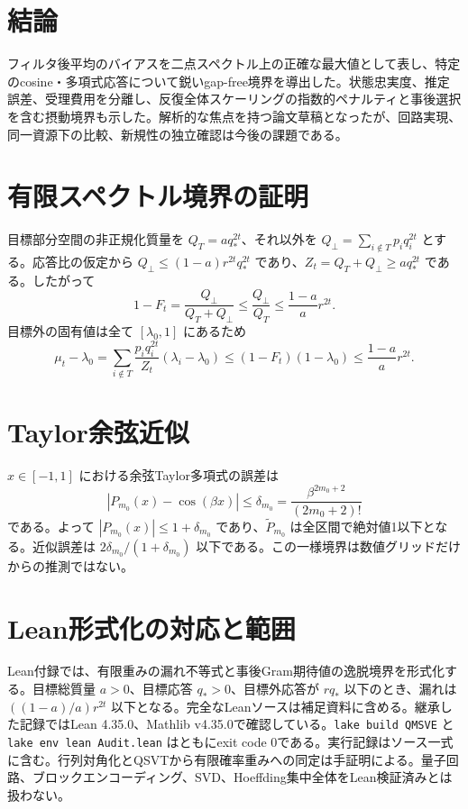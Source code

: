 \documentclass[11pt,a4paper]{article}
\begin{document}
{\section{結論}
フィルタ後平均のバイアスを二点スペクトル上の正確な最大値として表し、特定のcosine・多項式応答について鋭いgap-free境界を導出した。状態忠実度、推定誤差、受理費用を分離し、反復全体スケーリングの指数的ペナルティと事後選択を含む摂動境界も示した。解析的な焦点を持つ論文草稿となったが、回路実現、同一資源下の比較、新規性の独立確認は今後の課題である。

\appendix
\section{有限スペクトル境界の証明}
目標部分空間の非正規化質量を $Q_T=aq_*^{2t}$、それ以外を $Q_\perp=\sum_{i\notin T}p_iq_i^{2t}$ とする。応答比の仮定から $Q_\perp\leq(1-a)r^{2t}q_*^{2t}$ であり、$Z_t=Q_T+Q_\perp\geq aq_*^{2t}$ である。したがって
\[
 1-F_t=\frac{Q_\perp}{Q_T+Q_\perp}
 \leq\frac{Q_\perp}{Q_T}
 \leq\frac{1-a}{a}r^{2t}.
\]
目標外の固有値は全て $[\lambda_0,1]$ にあるため
\[
 \mu_t-\lambda_0
 =\sum_{i\notin T}\frac{p_iq_i^{2t}}{Z_t}(\lambda_i-\lambda_0)
 \leq(1-F_t)(1-\lambda_0)
 \leq\frac{1-a}{a}r^{2t}.
\]

\section{Taylor余弦近似}
$x\in[-1,1]$ における余弦Taylor多項式の誤差は
\[
 |P_{m_0}(x)-\cos(\beta x)|\leq
 \delta_{m_0}=\frac{\beta^{2m_0+2}}{(2m_0+2)!}
\]
である。よって $|P_{m_0}(x)|\leq1+\delta_{m_0}$ であり、$\widetilde P_{m_0}$ は全区間で絶対値1以下となる。近似誤差は $2\delta_{m_0}/(1+\delta_{m_0})$ 以下である。この一様境界は数値グリッドだけからの推測ではない。

\section{Lean形式化の対応と範囲}
Lean付録では、有限重みの漏れ不等式と事後Gram期待値の逸脱境界を形式化する。目標総質量 $a>0$、目標応答 $q_*>0$、目標外応答が $r q_*$ 以下のとき、漏れは $((1-a)/a)r^{2t}$ 以下となる。完全なLeanソースは補足資料に含める。継承した記録ではLean 4.35.0、Mathlib v4.35.0で確認している。\texttt{lake build QMSVE} と \texttt{lake env lean Audit.lean} はともにexit code 0である。実行記録はソース一式に含む。行列対角化とQSVTから有限確率重みへの同定は手証明による。量子回路、ブロックエンコーディング、SVD、Hoeffding集中全体をLean検証済みとは扱わない。

}
\end{document}
